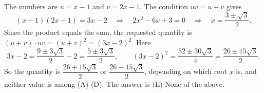 The numbers are $u=x-1$ and $v=2x-1$. The condition $uv=u+v$ gives
\[
(x-1)(2x-1)=3x-2\quad\Longrightarrow\quad 2x^2-6x+3=0\quad\Longrightarrow\quad x=\dfrac{3\pm\sqrt3}{2}.
\]
Since the product equals the sum, the requested quantity is $(u+v)\cdot uv=(u+v)^2=(3x-2)^2$. Here
\[
3x-2=\dfrac{9\pm3\sqrt3}{2}-2=\dfrac{5\pm3\sqrt3}{2},\qquad (3x-2)^2=\dfrac{52\pm30\sqrt3}{4}=\dfrac{26\pm15\sqrt3}{2}.
\]
So the quantity is $\dfrac{26+15\sqrt3}{2}$ or $\dfrac{26-15\sqrt3}{2}$, depending on which root $x$ is, and neither value is among (A)-(D). The answer is $\boxed{\text{(E) None of the above}}$.
